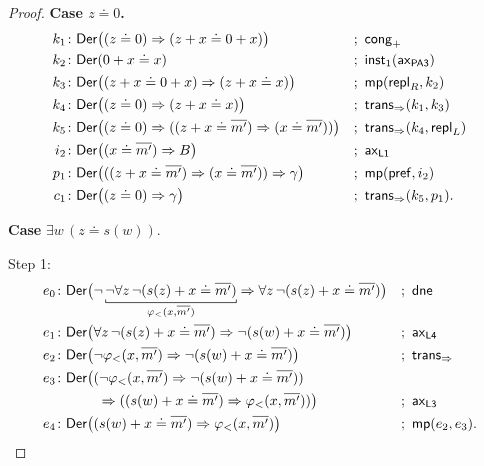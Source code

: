 \begin{proof}
    \textbf{Case $z\doteq0$.}
    \begin{align*}
        k_1&\colon\fun{Der}\bigl(
            (z\doteq 0)\imp(z+x\doteq 0+x)
        \bigr)
            &&;\ \fun{cong}_+\\
        k_2&\colon\fun{Der}(0+x\doteq x)
            &&;\ \fun{inst}_1(\fun{ax}_{\fun{PA3}})\\
        k_3&\colon\fun{Der}\bigl(
            (z+x\doteq 0+x)\imp(z+x\doteq x)
        \bigr)
            &&;\ \fun{mp}(\fun{repl}_R,k_2)\\
        k_4&\colon\fun{Der}\bigl(
            (z\doteq 0)\imp(z+x\doteq x)
        \bigr)
            &&;\ \fun{trans}_{\imp}(k_1,k_3)\\
        k_5&\colon\fun{Der}\bigl(
            (z\doteq 0)
            \imp
            ((z+x\doteq\num{m'})\imp(x\doteq\num{m'}))
        \bigr)
            &&;\ \fun{trans}_{\imp}(k_4,\fun{repl}_L)\\
        i_2&\colon\fun{Der}\bigl(
            (x\doteq\num{m'})\imp B
        \bigr)
            &&;\ \fun{ax}_{\fun{L1}}\\
        p_1&\colon\fun{Der}\bigl(
            ((z+x\doteq\num{m'})\imp(x\doteq\num{m'}))
            \imp
            \gamma
        \bigr)
            &&;\ \fun{mp}(\fun{pref},i_2)\\
        c_1&\colon\fun{Der}\bigl(
            (z\doteq 0)\imp\gamma
        \bigr)
            &&;\ \fun{trans}_{\imp}(k_5,p_1).
    \end{align*}

    \textbf{Case} $\exists w\,(z\doteq s(w))$. 

    Step 1:
    \begin{align*}
        e_0&\colon\fun{Der}\bigl(
            \neg\explain[\varphi_<(x,\num{m'})]{
                \neg\forall z\,\neg(s(z)+x\doteq\num{m'})
            }
            \imp
            \forall z\,\neg(s(z)+x\doteq\num{m'})
        \bigr)
            &&;\ \fun{dne}\\
        e_1&\colon\fun{Der}\bigl(
            \forall z\,\neg(s(z)+x\doteq\num{m'})
            \imp
            \neg(s(w)+x\doteq\num{m'})
        \bigr)
            &&;\ \fun{ax}_{\fun{L4}}\\
        e_2&\colon\fun{Der}\bigl(
            \neg\varphi_<(x,\num{m'})
            \imp
            \neg(s(w)+x\doteq\num{m'})
        \bigr)
            &&;\ \fun{trans}_{\imp}\\
        e_3&\colon\fun{Der}\bigl(
            (
                \neg\varphi_<(x,\num{m'})
                \imp
                \neg(s(w)+x\doteq\num{m'})
            )\\
            &\quad\quad\quad\imp
            (
                (s(w)+x\doteq\num{m'})
                \imp
                \varphi_<(x,\num{m'})
            )
        \bigr)
            &&;\ \fun{ax}_{\fun{L3}}\\
        e_4&\colon\fun{Der}\bigl(
            (s(w)+x\doteq\num{m'})\imp\varphi_<(x,\num{m'})
        \bigr)
            &&;\ \fun{mp}(e_2,e_3).
    \end{align*}
    

\end{proof}
